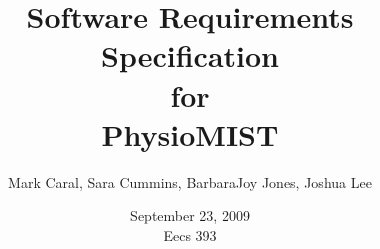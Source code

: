 \documentclass{article}
\title{Software Requirements Specification\\
\bigskip
{\large for}\\
\bigskip
PhysioMIST}
\author{Mark Caral, Sara Cummins, BarbaraJoy Jones, Joshua Lee}
\date{September 23, 2009\\{\sc Eecs} 393}
\begin{document}
\begin{titlepage}
\maketitle
\end{titlepage}

\tableofcontents
\newpage
\end{document}

